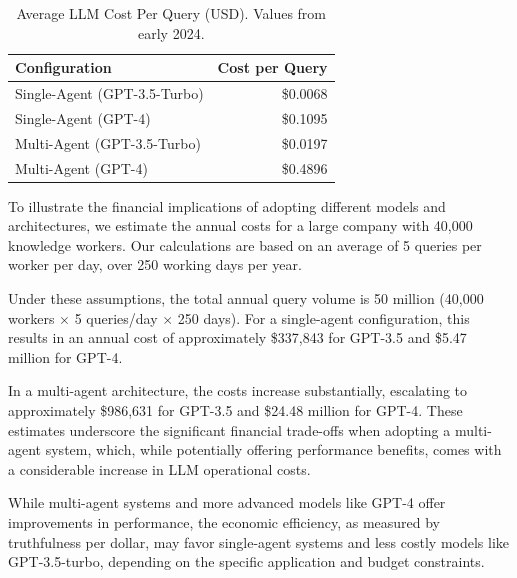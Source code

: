                 \begin{table}[h!]
                \centering
                \caption{Average LLM Cost Per Query (USD). Values from early 2024.}
                \label{tab:cost_per_query}
                \begin{tabular}{l r}
                \toprule
                \textbf{Configuration} & \textbf{Cost per Query} \\
                \midrule
                Single-Agent (GPT-3.5-Turbo) & \$0.0068 \\
                Single-Agent (GPT-4) & \$0.1095 \\
                Multi-Agent (GPT-3.5-Turbo) & \$0.0197 \\
                Multi-Agent (GPT-4) & \$0.4896 \\
                \bottomrule
                \end{tabular}
                \end{table}

                To illustrate the financial implications of adopting different models and architectures, we estimate the annual costs for a large company with 40,000 knowledge workers. Our calculations are based on an average of 5 queries per worker per day, over 250 working days per year.
                
                Under these assumptions, the total annual query volume is 50 million (40,000 workers $\times$ 5 queries/day $\times$ 250 days). For a single-agent configuration, this results in an annual cost of approximately \$337,843 for GPT-3.5 and \$5.47 million for GPT-4.
                
                In a multi-agent architecture, the costs increase substantially, escalating to approximately \$986,631 for GPT-3.5 and \$24.48 million for GPT-4. These estimates underscore the significant financial trade-offs when adopting a multi-agent system, which, while potentially offering performance benefits, comes with a considerable increase in LLM operational costs.

                While multi-agent systems and more advanced models like GPT-4 offer improvements in performance, the economic efficiency, as measured by truthfulness per dollar, may favor single-agent systems and less costly models like GPT-3.5-turbo, depending on the specific application and budget constraints.
                
